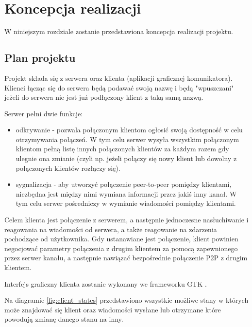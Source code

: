 \chapter{Koncepcja realizacji}

W niniejszym rozdziale zostanie przedstawiona koncepcja realizacji projektu.

\section{Plan projektu}

Projekt składa się z serwera oraz klienta (aplikacji graficznej komunikatora). Klienci łącząc
się do serwera będą podawać swoją nazwę i będą "wpuszczani" jeżeli do serwera nie jest już
podłączony klient z taką samą nazwą.

Serwer pełni dwie funkcje:

\begin{itemize}
      \item odkrywanie - pozwala połączonym klientom ogłosić swoją dostępność w celu otrzymywania
            połączeń. W tym celu serwer wysyła wszystkim połączonym klientom pełną listę innych
            połączonych klientów za każdym razem gdy ulegnie ona zmianie (czyli np. jeżeli połączy
            się nowy klient lub dowolny z połączonych klientów rozłączy się).
      \item sygnalizacja - aby utworzyć połączenie peer-to-peer pomiędzy klientami, niezbędna jest
            między nimi wymiana informacji przez jakiś inny kanał. W tym celu serwer pośredniczy w
            wymianie wiadomości pomiędzy klientami.
\end{itemize}

Celem klienta jest połączenie z serwerem, a następnie jednoczesne nasłuchiwanie i reagowania na
wiadomości od serwera, a także reagowanie na zdarzenia pochodzące od użytkownika. Gdy ustanawiane
jest połączenie, klient powinien negocjować parametry połączenia z drugim klientem za pomocą
zapewnionego przez serwer kanału, a następnie nawiązać bezpośrednie połączenie P2P z drugim
klientem.

Interfejs graficzny klienta zostanie wykonany we frameworku GTK \cite{gui_rust_gtk}.

Na diagramie \ref{fig:client_states} przedstawiono wszystkie możliwe stany w których może znajdować
się klient oraz wiadomości wysłane lub otrzymane które powodują zmianę danego stanu na inny.

